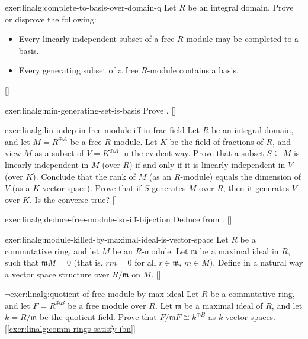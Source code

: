 \begin{exer}{\exerused}{exer:linalg:complete-to-basis-over-domain-q}
  Let $R$ be an integral domain. Prove or disprove the following:
  \begin{itemize}
  \item Every linearly independent subset of a free $R$-module may be
    completed to a basis.
  \item Every generating subset of a free $R$-module contains a basis.
  \end{itemize} []
\end{exer}
\begin{exer}{\exerused}{exer:linalg:min-generating-set-is-basis}
  Prove . []
\end{exer}
\begin{exer}{\exerused}{exer:linalg:lin-indep-in-free-module-iff-in-frac-field}
  Let $R$ be an integral domain, and let $M = R^{\oplus A}$ be a free
  $R$-module. Let $K$ be the field of fractions of $R$, and view $M$
  as a subset of $V = K^{\oplus A}$ in the evident way. Prove that a
  subset $S \subseteq M$ is linearly independent in $M$ (over $R$) if
  and only if it is linearly independent in $V$ (over $K$). Conclude
  that the rank of $M$ (as an $R$-module) equals the dimension of $V$
  (as a $K$-vector space). Prove that if $S$ generates $M$ over $R$,
  then it generates $V$ over $K$. Is the converse true?
  []
\end{exer}
\begin{exer}{\exerused}{exer:linalg:deduce-free-module-iso-iff-bijection}
  Deduce  from
  . []
\end{exer}
\begin{exer}{\exerused}{exer:linalg:module-killed-by-maximal-ideal-is-vector-space}
  Let $R$ be a commutative ring, and let $M$ be an $R$-module. Let
  $\mathfrak{m}$ be a maximal ideal in $R$, such that
  $\mathfrak{m}M = 0$ (that is, $rm = 0$ for all $r \in \mathfrak{m}$,
  $m \in M$). Define in a natural way a vector space structure over
  $R/\mathfrak{m}$ on $M$.
  []
\end{exer}
\begin{exer}{$\lnot$}{exer:linalg:quotient-of-free-module-by-max-ideal}
  Let $R$ be a commutative ring, and let $F = R^{\oplus B}$ be a free
  module over $R$. Let $\mathfrak{m}$ be a maximal ideal of $R$, and
  let $k = R/\mathfrak{m}$ be the quotient field. Prove that
  $F/\mathfrak{m}F \cong k^{\oplus B}$ as $k$-vector
  spaces. [\ref{exer:linalg:comm-rings-satisfy-ibn}]
\end{exer}
